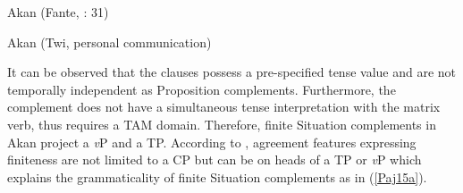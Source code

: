 \documentclass[output=paper]{langscibook}
\begin{document}
\begin{exe}
\ex \label{Paj14} Akan (Fante, \citealt{osam1998}: 31)
\begin{xlist}



\end{xlist}

\ex \label{Paj15} Akan (Twi, personal communication)
\begin{xlist}



\end{xlist}
\end{exe}
 

It can be observed that the clauses possess a pre-specified tense value and are not temporally independent as Proposition complements. Furthermore, the complement does not have a simultaneous tense interpretation with the matrix verb, thus requires a TAM domain. Therefore, finite Situation complements in Akan project a \emph{v}P and a TP. According to \citet{adger2007}, agreement features expressing finiteness are not limited to a CP but can be on heads of a TP or \emph{v}P which explains the grammaticality of finite Situation complements as in (\ref{Paj15a}). 
	
\end{document}
